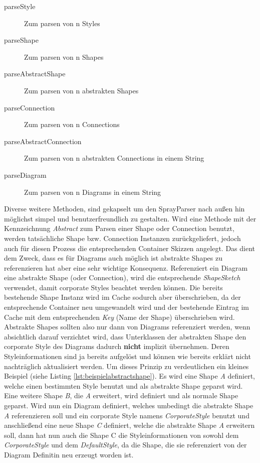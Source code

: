 \begin{description}
\item[parseStyle] Zum parsen von n Styles
\item[parseShape] Zum parsen von n Shapes
\item[parseAbstractShape] Zum parsen von n abstrakten Shapes
\item[parseConnection] Zum parsen von n Connections
\item[parseAbstractConnection] Zum parsen von n abstrakten Connections in einem String
\item[parseDiagram] Zum parsen von n Diagrams in einem String
\end{description}
Diverse weitere Methoden, sind gekapselt um den SprayParser nach außen hin möglichst simpel und benutzerfreundlich zu gestalten.
Wird eine Methode mit der Kennzeichnung \textit{Abstract} zum Parsen einer Shape oder Connection benutzt, werden tatsächliche Shape bzw. Connection Instanzen zurückgeliefert, jedoch auch für diesen Prozess die entsprechenden Container Skizzen angelegt. Das dient dem Zweck, dass es für Diagrams auch möglich ist abstrakte Shapes zu referenzieren hat aber eine sehr wichtige Konsequenz. Referenziert ein Diagram eine abstrakte Shape (oder Connection), wird die entsprechende \textit{ShapeSketch} verwendet, damit corporate Styles beachtet werden können. Die bereits bestehende Shape Instanz wird im Cache sodurch aber überschrieben, da der entsprechende Container neu umgewandelt wird und der bestehende Eintrag im Cache mit dem entsprechenden \textit{Key} (Name der Shape) überschrieben wird. Abstrakte Shapes sollten also nur dann von Diagrams referenziert werden, wenn absichtlich darauf verzichtet wird, dass Unterklassen der abstrakten Shape den corporate Style des Diagrams dadurch \textbf{nicht} implizit übernehmen. Deren Styleinformationen sind ja bereits aufgelöst und können wie bereits erklärt nicht nachträglich aktualisiert werden.
Um dieses Prinzip zu verdeutlichen ein kleines Beispiel (siehe Listing \ref{lst:beispielabstractshape}). Es wird eine Shape \textit{A} definiert, welche einen bestimmten Style benutzt und als abstrakte Shape geparst wird. Eine weitere Shape \textit{B}, die \textit{A} erweitert, wird definiert und als normale Shape geparst. Wird nun ein Diagram definiert, welches umbedingt die abstrakte Shape \textit{A} referenzieren soll und ein corporate Style namens \textit{CorporateStyle} benutzt und anschließend eine neue Shape \textit{C} definiert, welche die abstrakte Shape \textit{A} erweitern soll, dann hat nun auch die Shape C die Styleinformationen von sowohl dem \textit{CorporateStyle} und dem \textit{DefaultStyle}, da die Shape, die sie referenziert von der Diagram Definitin neu erzeugt worden ist.
